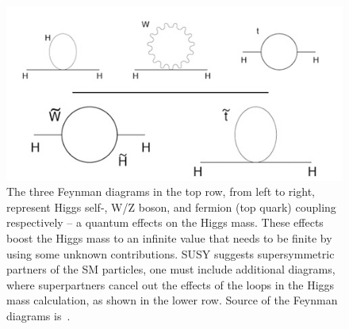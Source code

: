 \begin{figure}[htp]
\centering
\hspace{-0.3cm}
\includegraphics[scale=0.65]{fig/sm_beyond/higgs_mass_loop.jpg}
\caption{\label{fig:higgs_massloop}The three Feynman diagrams in the top row, from left to right, represent Higgs self-, W/Z boson, and fermion (top quark) coupling respectively – a quantum effects on the Higgs mass. These effects boost the Higgs mass to an infinite value that needs to be finite by using some unknown contributions. SUSY suggests supersymmetric partners of the SM particles, one must include additional diagrams, where superpartners cancel out the effects of the loops in the Higgs mass calculation, as shown in the lower row. Source of the Feynman diagrams is~\cite{pub:higgsmassloop}.}
\end{figure}

